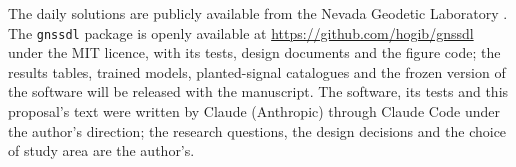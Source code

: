 \documentclass[preprint,12pt,authoryear]{elsarticle}
\begin{document}
The daily solutions are publicly available from the Nevada Geodetic Laboratory \citep{ngl2026}. The \texttt{gnssdl} package is openly available at \url{https://github.com/hogib/gnssdl} under the MIT licence, with its tests, design documents and the figure code; the results tables, trained models, planted-signal catalogues and the frozen version of the software will be released with the manuscript. The software, its tests and this proposal's text were written by Claude (Anthropic) through Claude Code under the author's direction; the research questions, the design decisions and the choice of study area are the author's.



\end{document}
